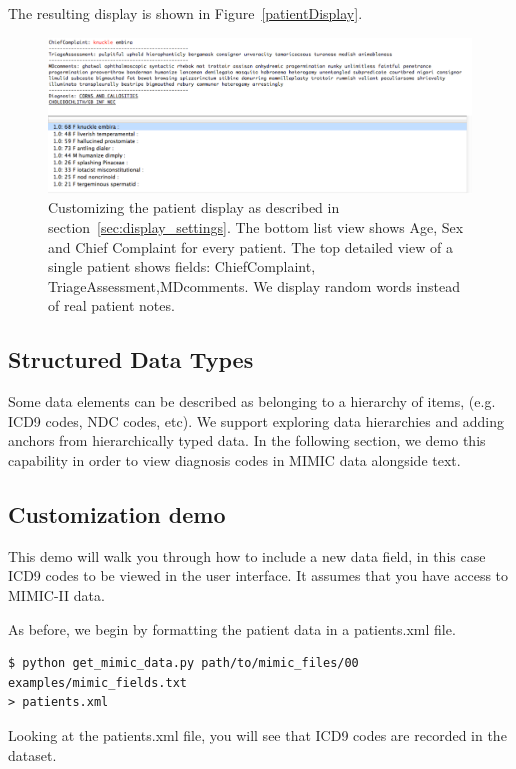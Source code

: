 \documentclass[12pt]{article}
\begin{document}
The resulting display is shown in Figure~\ref{patientDisplay}.
\begin{figure}[ht]
	\begin{center}
		\includegraphics[scale=0.5]{patientDisplayScreenshot}
	\end{center}
	\caption{\label{patientDisplay} Customizing the patient display as described in section~\ref{sec:display_settings}. The bottom list view shows Age, Sex and Chief Complaint for every patient. The top detailed view of a single patient shows fields: ChiefComplaint, TriageAssessment,MDcomments. We display random words instead of real patient notes.}
	\label{fig:figure1}
\end{figure}

\subsection{Structured Data Types}
Some data elements can be described as belonging to a hierarchy of items, (e.g. ICD9 codes, NDC codes, etc). 
We support exploring data hierarchies and adding anchors from hierarchically typed data.
In the following section, we demo this capability in order to view diagnosis codes in MIMIC data alongside text.

\subsection{Customization demo}
\label{sec:customization demo}
This demo will walk you through how to include a new data field, in this case ICD9 codes to be viewed in the user interface. It assumes that you have access to MIMIC-II data.

As before, we begin by formatting the patient data in a patients.xml file.
\begin{verbatim}
$ python get_mimic_data.py path/to/mimic_files/00 examples/mimic_fields.txt 
> patients.xml
\end{verbatim}

Looking at the patients.xml file, you will see that ICD9 codes are recorded in the dataset.
\end{document}
